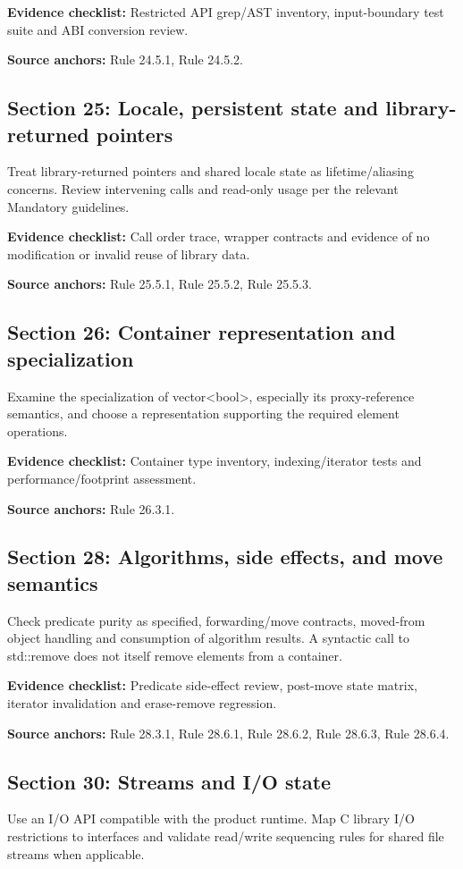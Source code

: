 \documentclass[10pt,letterpaper]{article}
\begin{document}
\textbf{Evidence checklist:} Restricted API grep/AST inventory, input-boundary test suite and ABI conversion review.

\textbf{Source anchors:} Rule 24.5.1, Rule 24.5.2.

\subsection{Section 25: Locale, persistent state and library-returned pointers}
Treat library-returned pointers and shared locale state as lifetime/aliasing concerns. Review intervening calls and read-only usage per the relevant Mandatory guidelines.

\textbf{Evidence checklist:} Call order trace, wrapper contracts and evidence of no modification or invalid reuse of library data.

\textbf{Source anchors:} Rule 25.5.1, Rule 25.5.2, Rule 25.5.3.

\subsection{Section 26: Container representation and specialization}
Examine the specialization of vector<bool>, especially its proxy-reference semantics, and choose a representation supporting the required element operations.

\textbf{Evidence checklist:} Container type inventory, indexing/iterator tests and performance/footprint assessment.

\textbf{Source anchors:} Rule 26.3.1.

\subsection{Section 28: Algorithms, side effects, and move semantics}
Check predicate purity as specified, forwarding/move contracts, moved-from object handling and consumption of algorithm results. A syntactic call to std::remove does not itself remove elements from a container.

\textbf{Evidence checklist:} Predicate side-effect review, post-move state matrix, iterator invalidation and erase-remove regression.

\textbf{Source anchors:} Rule 28.3.1, Rule 28.6.1, Rule 28.6.2, Rule 28.6.3, Rule 28.6.4.

\subsection{Section 30: Streams and I/O state}
Use an I/O API compatible with the product runtime. Map C library I/O restrictions to interfaces and validate read/write sequencing rules for shared file streams when applicable.
\end{document}
